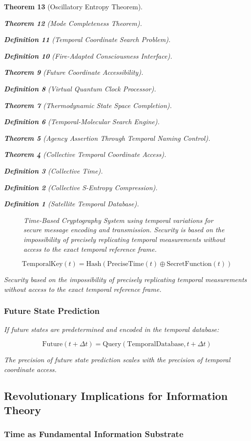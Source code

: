 \documentclass[12pt,a4paper]{article}
\newtheorem{theorem}{Theorem}[section]
\newtheorem{definition}[theorem]{Definition}
\begin{document}
\begin{theorem}[Oscillatory Entropy Theorem]
\begin{theorem}[Mode Completeness Theorem]
\begin{enumerate}
\begin{definition}[Temporal Coordinate Search Problem]
\begin{algorithm}
\begin{definition}[Fire-Adapted Consciousness Interface]
\begin{theorem}[Future Coordinate Accessibility]
\begin{definition}[Virtual Quantum Clock Processor]
\begin{itemize}
\begin{itemize}
\begin{theorem}[Thermodynamic State Space Completion]
\begin{definition}[Temporal-Molecular Search Engine]
\begin{theorem}[Agency Assertion Through Temporal Naming Control]
\begin{remark}
\begin{theorem}[Collective Temporal Coordinate Access]
\begin{definition}[Collective Time]
\begin{definition}[Collective S-Entropy Compression]
\begin{definition}[Satellite Temporal Database]
\begin{algorithm}
\begin{table}[h]
{{\begin{figure}[H]
\begin{tikzpicture}[scale=0.7]
\end{tikzpicture}
\caption{Time-Based Cryptography System using temporal variations for secure message encoding and transmission. Security is based on the impossibility of precisely replicating temporal measurements without access to the exact temporal reference frame.}
\label{fig:time_based_cryptography}
\end{figure}

\begin{equation}
\text{TemporalKey}(t) = \text{Hash}(\text{PreciseTime}(t) \oplus \text{SecretFunction}(t))
\end{equation}

Security based on the impossibility of precisely replicating temporal measurements without access to the exact temporal reference frame.

\subsubsection{Future State Prediction}

If future states are predetermined and encoded in the temporal database:

\begin{equation}
\text{Future}(t + \Delta t) = \text{Query}(\text{TemporalDatabase}, t + \Delta t)
\end{equation}

The precision of future state prediction scales with the precision of temporal coordinate access.

\subsection{Revolutionary Implications for Information Theory}

\subsubsection{Time as Fundamental Information Substrate}

}}
\end{table}
\end{algorithm}
\end{definition}
\end{definition}
\end{definition}
\end{theorem}
\end{remark}
\end{theorem}
\end{definition}
\end{theorem}
\end{itemize}
\end{itemize}
\end{definition}
\end{theorem}
\end{definition}
\end{algorithm}
\end{definition}
\end{enumerate}
\end{theorem}
\end{theorem}
\end{document}
